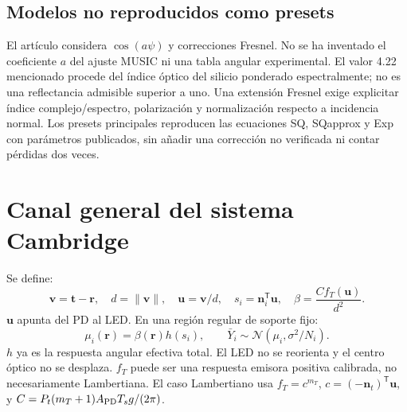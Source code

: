 \documentclass[11pt,a4paper]{article}
\begin{document}
\subsection{Modelos no reproducidos como presets}
El artículo considera $\cos(a\psi)$ y correcciones Fresnel. No se ha inventado el coeficiente $a$ del ajuste MUSIC ni una tabla angular experimental. El valor 4.22 mencionado procede del índice óptico del silicio ponderado espectralmente; no es una reflectancia admisible superior a uno. Una extensión Fresnel exige explicitar índice complejo/espectro, polarización y normalización respecto a incidencia normal. Los presets principales reproducen las ecuaciones SQ, SQapprox y Exp con parámetros publicados, sin añadir una corrección no verificada ni contar pérdidas dos veces.

\section{Canal general del sistema Cambridge}
Se define:
\begin{equation}
 \mathbf v=\mathbf t-\mathbf r,\quad d=\|\mathbf v\|,\quad \mathbf u=\mathbf v/d,
 \quad s_i=\mathbf n_i^{\mathsf T}\mathbf u,\quad \beta=\frac{Cf_T(\mathbf u)}{d^2}.
\end{equation}
$\mathbf u$ apunta del PD al LED. En una región regular de soporte fijo:
\begin{equation}
 \mu_i(\mathbf r)=\beta(\mathbf r)h(s_i),\qquad
 \bar Y_i\sim\mathcal N(\mu_i,\sigma^2/N_i).
\label{eq:generalchannel}
\end{equation}
$h$ ya es la respuesta angular efectiva total. El LED no se reorienta y el centro óptico no se desplaza. $f_T$ puede ser una respuesta emisora positiva calibrada, no necesariamente Lambertiana. El caso Lambertiano usa $f_T=c^{m_T}$, $c=(-\mathbf n_t)^{\mathsf T}\mathbf u$, y $C=P_t(m_T+1)A_{\rm PD}T_sg/(2\pi)$.
\end{document}
